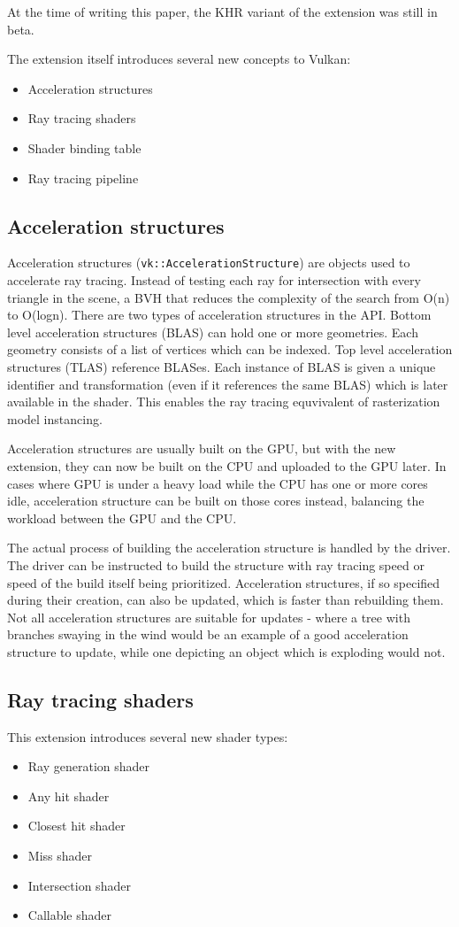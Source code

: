 \documentclass[times, utf8, zavrsni, numeric]{fer}
\begin{document}
At the time of writing this paper, the KHR variant of the extension was still in beta.

The extension itself introduces several new concepts to Vulkan:
\begin{itemize}
	\item{Acceleration structures}
	\item{Ray tracing shaders}
	\item{Shader binding table}
	\item{Ray tracing pipeline}
\end{itemize}

\subsection{Acceleration structures}
Acceleration structures (\texttt{vk::AccelerationStructure}) are objects used to accelerate ray tracing. Instead of testing each ray for intersection with every triangle in the scene, a BVH that reduces the complexity of the search from O(n) to O(logn). There are two types of acceleration structures in the API. Bottom level acceleration structures (BLAS) can hold one or more geometries. Each geometry consists of a list of vertices which can be indexed. Top level acceleration structures (TLAS) reference BLASes. Each instance of BLAS is given a unique identifier and transformation (even if it references the same BLAS) which is later available in the shader. This enables the ray tracing equvivalent of rasterization model instancing.

Acceleration structures are usually built on the GPU, but with the new extension, they can now be built on the CPU and uploaded to the GPU later. In cases where GPU is under a heavy load while the CPU has one or more cores idle, acceleration structure can be built on those cores instead, balancing the workload between the GPU and the CPU.

The actual process of building the acceleration structure is handled by the driver. The driver can be instructed to build the structure with ray tracing speed or speed of the build itself being prioritized. Acceleration structures, if so specified during their creation, can also be updated, which is faster than rebuilding them. Not all acceleration structures are suitable for updates - where a tree with branches swaying in the wind would be an example of a good acceleration structure to update, while one depicting an object which is exploding would not.

\subsection{Ray tracing shaders}
This extension introduces several new shader types:
\begin{itemize}
	\item{Ray generation shader}
	\item{Any hit shader}
	\item{Closest hit shader}
	\item{Miss shader}
	\item{Intersection shader}
	\item{Callable shader}
\end{itemize}
\end{document}
